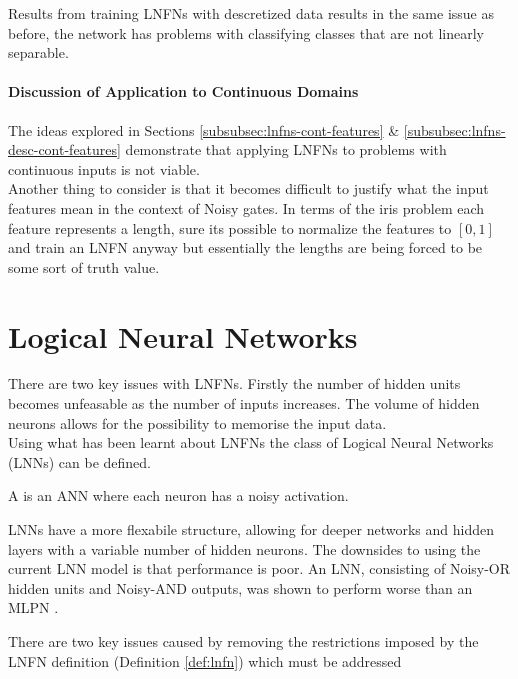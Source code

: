 Results from training LNFNs with descretized data results in the same issue as before, the network has problems with classifying classes that are not linearly separable.

\subsubsection{Discussion of Application to Continuous Domains}
The ideas explored in Sections \ref{subsubsec:lnfns-cont-features} \& \ref{subsubsec:lnfns-desc-cont-features} demonstrate that applying LNFNs to problems with continuous inputs is not viable.\\

Another thing to consider is that it becomes difficult to justify what the input features mean in the context of Noisy gates. In terms of the iris problem each feature represents a length, sure its possible to normalize the features to $[0,1]$ and train an LNFN anyway but essentially the lengths are being forced to be some sort of truth value.

\chapter{Logical Neural Networks} \label{C:lnn}
There are two key issues with LNFNs. Firstly the number of hidden units becomes unfeasable as the number of inputs increases. The volume of hidden neurons allows for the possibility to memorise the input data.\\

Using what has been learnt about LNFNs the class of Logical Neural Networks (LNNs) can be defined.

\begin{definition}
	A  is an ANN where each neuron has a noisy activation.
\end{definition}

LNNs have a more flexabile structure, allowing for deeper networks and hidden layers with a variable number of hidden neurons. The downsides to using the current LNN model is that performance is poor. An LNN, consisting of Noisy-OR hidden units and Noisy-AND outputs, was shown to perform worse than an MLPN \cite{LearningLogicalActivations}. 

There are two key issues caused by removing the restrictions imposed by the LNFN definition (Definition \ref{def:lnfn}) which must be addressed 

